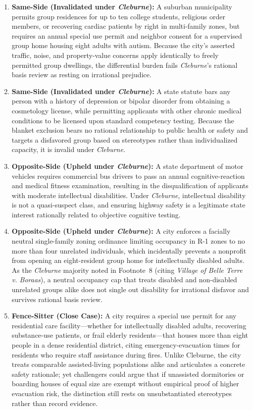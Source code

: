 \documentclass[12pt]{article}
\begin{document}
\begin{enumerate}
  \item \textbf{Same-Side (Invalidated under \textit{Cleburne}):} A suburban municipality permits group residences for up to ten college students, religious order members, or recovering cardiac patients by right in multi-family zones, but requires an annual special use permit and neighbor consent for a supervised group home housing eight adults with autism. Because the city's asserted traffic, noise, and property-value concerns apply identically to freely permitted group dwellings, the differential burden fails \textit{Cleburne}'s rational basis review as resting on irrational prejudice.
  \item \textbf{Same-Side (Invalidated under \textit{Cleburne}):} A state statute bars any person with a history of depression or bipolar disorder from obtaining a cosmetology license, while permitting applicants with other chronic medical conditions to be licensed upon standard competency testing. Because the blanket exclusion bears no rational relationship to public health or safety and targets a disfavored group based on stereotypes rather than individualized capacity, it is invalid under \textit{Cleburne}.
  \item \textbf{Opposite-Side (Upheld under \textit{Cleburne}):} A state department of motor vehicles requires commercial bus drivers to pass an annual cognitive-reaction and medical fitness examination, resulting in the disqualification of applicants with moderate intellectual disabilities. Under \textit{Cleburne}, intellectual disability is not a quasi-suspect class, and ensuring highway safety is a legitimate state interest rationally related to objective cognitive testing.
  \item \textbf{Opposite-Side (Upheld under \textit{Cleburne}):} A city enforces a facially neutral single-family zoning ordinance limiting occupancy in R-1 zones to no more than four unrelated individuals, which incidentally prevents a nonprofit from opening an eight-resident group home for intellectually disabled adults. As the \textit{Cleburne} majority noted in Footnote~8 (citing \textit{Village of Belle Terre v. Boraas}), a neutral occupancy cap that treats disabled and non-disabled unrelated groups alike does not single out disability for irrational disfavor and survives rational basis review.
  \item \textbf{Fence-Sitter (Close Case):} A city requires a special use permit for any residential care facility---whether for intellectually disabled adults, recovering substance-use patients, or frail elderly residents---that houses more than eight people in a dense residential district, citing emergency-evacuation times for residents who require staff assistance during fires. Unlike Cleburne, the city treats comparable assisted-living populations alike and articulates a concrete safety rationale; yet challengers could argue that if unassisted dormitories or boarding houses of equal size are exempt without empirical proof of higher evacuation risk, the distinction still rests on unsubstantiated stereotypes rather than record evidence.
\end{enumerate}
\end{document}

